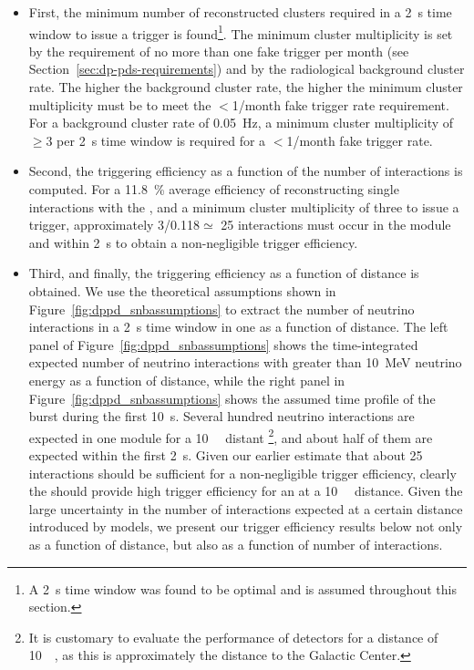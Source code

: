 \begin{itemize}
\item First, the minimum number of reconstructed clusters required in a \SI{2}{\s} time window  to issue a trigger is found\footnote{A \SI{2}{\s} time window was found to be optimal and is assumed throughout this section.}. The minimum cluster multiplicity is set by the requirement of no more than one fake trigger per month (see Section~\ref{sec:dp-pds-requirements}) and by the radiological background cluster rate. The higher the background cluster rate, the higher the minimum cluster multiplicity must be to meet the $<$\num{1}/month fake trigger rate requirement. For a background cluster rate of \SI{0.05}{\Hz}, a minimum cluster multiplicity of $\ge$\num{3} per \SI{2}{\s} time window is required for a $<$\num{1}/month fake trigger rate.
%
\item Second, the  triggering efficiency as a function of the number of  interactions is computed. For a \SI{11.8}{\%} average efficiency of reconstructing single  \nue interactions with the , and a minimum cluster multiplicity of three to issue a trigger, approximately \num{3}/\num{0.118}$\simeq$ \num{25} interactions must occur in the  module and within \SI{2}{\s} to obtain a non-negligible trigger efficiency. 
%
\item Third, and finally, the  triggering efficiency as a function of  distance is obtained. We use the theoretical assumptions shown in Figure~\ref{fig:dppd_snbassumptions} to extract the number of  neutrino interactions in a \SI{2}{\s} time window %
in one  as a function of  distance. The left panel of Figure~\ref{fig:dppd_snbassumptions} shows the time-integrated expected number of  neutrino interactions with greater than \SI{10}{MeV} neutrino energy as a function of distance, while the right panel in Figure~\ref{fig:dppd_snbassumptions} shows the assumed time profile of the burst during the first \SI{10}{\s}. Several hundred  neutrino interactions are expected in one   module for a \SI{10}{\kilo\parsec} distant \footnote{It is customary to evaluate the performance of  detectors for a  distance of \SI{10}{\kilo\parsec}, as this is approximately the distance to the Galactic Center.}, and about half of them are expected within the first \SI{2}{\s}. Given our earlier estimate that about \num{25} interactions should be sufficient for a non-negligible trigger efficiency, clearly the  should provide high  trigger efficiency for an  at a \SI{10}{\kilo\parsec} distance. Given the large uncertainty in the number of interactions expected at a certain  distance introduced by  models, we present our trigger efficiency results below not only as a function of  distance, but also as a function of number of  interactions. 
\end{itemize}

